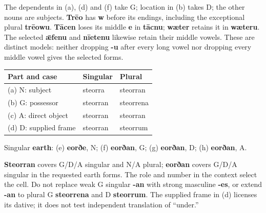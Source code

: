 The dependents in (a), (d) and (f) take G; location in (b) takes D; the other nouns are subjects. \textbf{Trēo} has \textbf{w} before its endings, including the exceptional plural \textbf{trēowu}. \textbf{Tācen} loses its middle \textbf{e} in \textbf{tācnu}; \textbf{wæter} retains it in \textbf{wæteru}. The selected \textbf{ǣfenu} and \textbf{nīetenu} likewise retain their middle vowels. These are distinct models: neither dropping \textbf{-u} after every long vowel nor dropping every middle vowel gives the selected forms.


\par\begingroup
\fontsize{10.5}{13.2}\selectfont
\setlength{\LTleft}{0pt}\setlength{\LTright}{\fill}
\noindent
\begin{tabular}{@{}>{\raggedright\arraybackslash}p{49.553mm}>{\raggedright\arraybackslash}p{34.412mm}>{\raggedright\arraybackslash}p{34.412mm}@{}}
\toprule
\textbf{Part and case} & \textbf{Singular} & \textbf{Plural} \\
\midrule
(a) N: subject & steorra & steorran \\
(b) G: possessor & steorran & steorrena \\
(c) A: direct object & steorran & steorran \\
(d) D: supplied frame & steorran & steorrum \\
\bottomrule
\end{tabular}
\par\endgroup

Singular \textbf{earth}: (e) \textbf{eorðe}, N; (f) \textbf{eorðan}, G; (g) \textbf{eorðan}, D; (h) \textbf{eorðan}, A.

\textbf{Steorran} covers G/\allowbreak{}D/\allowbreak{}A singular and N/\allowbreak{}A plural; \textbf{eorðan} covers G/\allowbreak{}D/\allowbreak{}A singular in the requested earth forms. The role and number in the context select the cell. Do not replace weak G singular \textbf{-an} with strong masculine \textbf{-es}, or extend \textbf{-an} to plural G \textbf{steorrena} and D \textbf{steorrum}. The supplied frame in (d) licenses its dative; it does not test independent translation of “under.”

